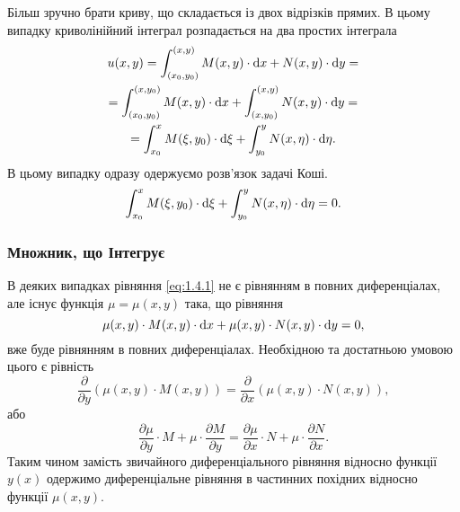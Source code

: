 Більш зручно брати криву, що складається із двох відрізків прямих. В цьому випадку криволінійний інтеграл розпадається на два простих інтеграла
\begin{multline}
	\label{eq:1.4.9}
	u(x, y) = \int_{(x_0, y_0)}^{(x,y)} M(x,y) \cdot \mathop{}\!\mathrm{d} x + N(x, y) \cdot \mathop{}\!\mathrm{d} y = \\
	= \int_{(x_0, y_0)}^{(x,y_0)} M(x,y) \cdot \mathop{}\!\mathrm{d} x + \int_{(x,y_0)}^{(x,y)} N(x, y) \cdot \mathop{}\!\mathrm{d} y = \\
	= \int_{x_0}^{x} M(\xi,y_0) \cdot \mathop{}\!\mathrm{d} \xi + \int_{y_0}^{y} N(x, \eta) \cdot \mathop{}\!\mathrm{d} \eta.
\end{multline}
В цьому випадку одразу одержуємо розв’язок задачі Коші.
\begin{equation}
	\label{eq:1.4.10}
	\int_{x_0}^{x} M(\xi,y_0) \cdot \mathop{}\!\mathrm{d} \xi + \int_{y_0}^{y} N(x, \eta) \cdot \mathop{}\!\mathrm{d} \eta = 0.
\end{equation}

\subsubsection{Множник, що Інтегрує}
В деяких випадках рівняння \eqref{eq:1.4.1} не є рівнянням в повних диференціалах, але існує функція $\mu = \mu(x,y)$ така, що рівняння
\begin{equation}
	\label{eq:1.4.11}
	\mu(x,y) \cdot M(x, y) \cdot \mathop{}\!\mathrm{d} x + \mu(x,y) \cdot N(x, y) \cdot \mathop{}\!\mathrm{d} y = 0,
\end{equation}
вже буде рівнянням в повних диференціалах. Необхідною та достатньою умовою цього є рівність
\begin{equation}
	\label{eq:1.4.12}
	\frac{\partial}{\partial y} (\mu(x,y) \cdot M(x, y)) = \frac{\partial}{\partial x} (\mu(x,y) \cdot N(x, y)),
\end{equation}
або
\begin{equation}
	\label{eq:1.4.13}
	\frac{\partial \mu}{\partial y} \cdot M + \mu \cdot \frac{\partial M}{\partial y} = \frac{\partial \mu}{\partial x} \cdot N + \mu \cdot \frac{\partial N}{\partial x}.
\end{equation}
Таким чином замість звичайного диференціального рівняння відносно функції $y(x)$ одержимо диференціальне рівняння в частинних похідних відносно функції $\mu(x, y)$. \\

